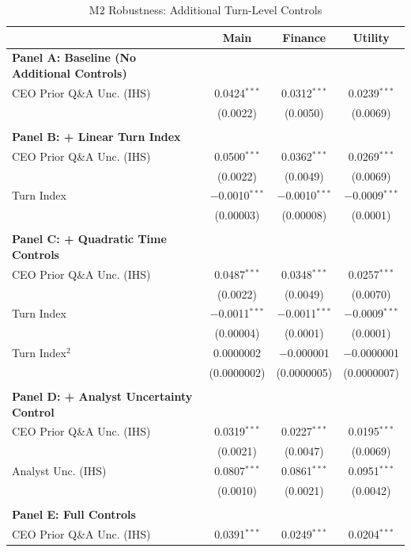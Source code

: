 \documentclass[11pt]{article}
\begin{document}
\begin{table}[htbp]
\centering
\caption{M2 Robustness: Additional Turn-Level Controls}
\label{tab:m2_controls}
\footnotesize
\setlength{\tabcolsep}{6pt}
\begin{tabular}{lccc}
\toprule
 & Main & Finance & Utility \\
\midrule
\textbf{Panel A: Baseline (No Additional Controls)} \\
CEO Prior Q\&A Unc. (IHS) & 0.0424$^{***}$ & 0.0312$^{***}$ & 0.0239$^{***}$ \\
 & (0.0022) & (0.0050) & (0.0069) \\
 &  &  & \\
\textbf{Panel B: + Linear Turn Index} \\
CEO Prior Q\&A Unc. (IHS) & 0.0500$^{***}$ & 0.0362$^{***}$ & 0.0269$^{***}$ \\
 & (0.0022) & (0.0049) & (0.0069) \\
Turn Index & $-$0.0010$^{***}$ & $-$0.0010$^{***}$ & $-$0.0009$^{***}$ \\
 & (0.00003) & (0.00008) & (0.0001) \\
 &  &  & \\
\textbf{Panel C: + Quadratic Time Controls} \\
CEO Prior Q\&A Unc. (IHS) & 0.0487$^{***}$ & 0.0348$^{***}$ & 0.0257$^{***}$ \\
 & (0.0022) & (0.0049) & (0.0070) \\
Turn Index & $-$0.0011$^{***}$ & $-$0.0011$^{***}$ & $-$0.0009$^{***}$ \\
 & (0.00004) & (0.0001) & (0.0001) \\
Turn Index$^2$ & 0.0000002 & $-$0.000001 & $-$0.0000001 \\
 & (0.0000002) & (0.0000005) & (0.0000007) \\
 &  &  & \\
\textbf{Panel D: + Analyst Uncertainty Control} \\
CEO Prior Q\&A Unc. (IHS) & 0.0319$^{***}$ & 0.0227$^{***}$ & 0.0195$^{***}$ \\
 & (0.0021) & (0.0047) & (0.0069) \\
Analyst Unc. (IHS) & 0.0807$^{***}$ & 0.0861$^{***}$ & 0.0951$^{***}$ \\
 & (0.0010) & (0.0021) & (0.0042) \\
 &  &  & \\
\textbf{Panel E: Full Controls} \\
CEO Prior Q\&A Unc. (IHS) & 0.0391$^{***}$ & 0.0249$^{***}$ & 0.0204$^{***}$ \\

\end{tabular}
\end{table}
\end{document}
